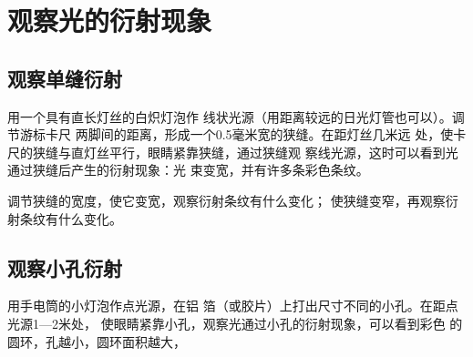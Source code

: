 \section{观察光的衍射现象}

\subsection{观察单缝衍射}

用一个具有直长灯丝的白炽灯泡作
线状光源（用距离较远的日光灯管也可以）。调节游标卡尺
两脚间的距离，形成一个0.5毫米宽的狭缝。在距灯丝几米远
处，使卡尺的狭缝与直灯丝平行，眼睛紧靠狭缝，通过狭缝观
察线光源，这时可以看到光通过狭缝后产生的衍射现象：光
束变宽，并有许多条彩色条纹。

调节狭缝的宽度，使它变宽，观察衍射条纹有什么变化；
使狭缝变窄，再观察衍射条纹有什么变化。

\subsection{观察小孔衍射}

用手电筒的小灯泡作点光源，在铝
箔（或胶片）上打出尺寸不同的小孔。在距点光源1—2米处，
使眼睛紧靠小孔，观察光通过小孔的衍射现象，可以看到彩色
的圆环，孔越小，圆环面积越大，

